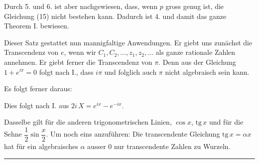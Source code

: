 Durch 5. und 6. ist aber nachgewiesen, dass, wenn $p$ gross genug ist, die Gleichung (15) nicht bestehen kann. Dadurch ist 4. und damit das ganze Theorem I. bewiesen.

Dieser Satz gestattet nun mannigfaltige Anwendungen. Er giebt uns zunächst die Transcendenz von $e$, wenn wir $C_1, C_2, \ldots, z_1, z_2, \ldots$ als ganze rationale Zahlen annehmen. Er giebt ferner die Transcendenz von $\pi$. Denn aus der Gleichung $1+e^{i\pi}=0$ folgt nach I., dass $i\pi$ und folglich auch $\pi$ nicht algebraisch sein kann.

Es folgt ferner daraus:




Dies folgt nach I. aus $2i\,X=e^{ix}-e^{-ix}$.

Dasselbe gilt für die anderen trigonometrischen Linien, $\cos x$, $\mathrm{tg}\,x$ und für die Sehne $\dfrac{1}{2}\sin\dfrac{x}{2}$. Um noch eins anzuführen: Die transcendente Gleichung $\mathrm{tg}\,x=\alpha x$ hat für ein algebraisches $\alpha$ ausser 0 nur transcendente Zahlen zu Wurzeln.

\begin{center}
\rule{4cm}{0.4pt}
\end{center}
